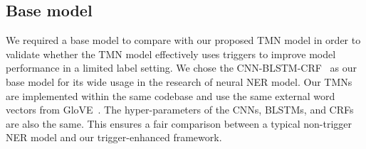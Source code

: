 \begin{table}[h]
	\begin{singlespace}
	\centering
	\caption{Statistics of the crowd-sourced entity triggers.} \label{tab:numtrig}
	\end{singlespace}
\end{table}


\subsection{Base model}
We required a base model to compare with our proposed TMN model in order to validate whether the TMN model effectively uses triggers to improve model performance in a limited label setting.
We chose the CNN-BLSTM-CRF~\citep{DBLP:conf/acl/MaH16} as our base model for its wide usage in the research of neural NER model.
Our TMNs are implemented within the same codebase and use the same external word vectors from GloVE~\citep{Pennington2014GloveGV}. The hyper-parameters of the CNNs, BLSTMs, and CRFs are also the same.
This ensures a fair comparison between a typical non-trigger NER model and our trigger-enhanced framework.

